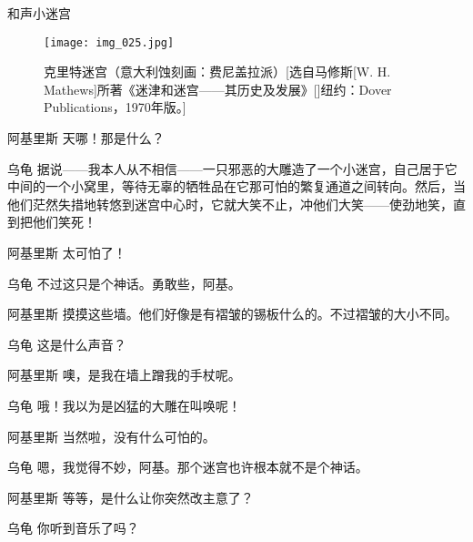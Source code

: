 \begin{dialog}{和声小迷宫}
\begin{dialogue}
\begin{dialogue}
\begin{dialogue}
\begin{dialogue}
\begin{figure}
\texttt{[image: img\_025.jpg]}
\caption[克里特迷宫。]
  {克里特迷宫（意大利蚀刻画：费尼盖拉派）[选自马修斯[W. H. Mathews]所著《迷津和迷宫——其历史及发展》[]纽约：Dover Publications，1970年版。]}
\end{figure}

      \item[阿基里斯]天哪！那是什么？

      \item[乌龟]据说——我本人从不相信——一只邪恶的大雕造了一个小迷宫，自己居于它中间的一个小窝里，等待无辜的牺牲品在它那可怕的繁复通道之间转向。然后，当他们茫然失措地转悠到迷宫中心时，它就大笑不止，冲他们大笑——使劲地笑，直到把他们笑死！

      \item[阿基里斯]太可怕了！

      \item[乌龟]不过这只是个神话。勇敢些，阿基。


      \item[阿基里斯]摸摸这些墙。他们好像是有褶皱的锡板什么的。不过褶皱的大小不同。


      \item[乌龟\dlnote{（吃惊地）}]这是什么声音？

      \item[阿基里斯]噢，是我在墙上蹭我的手杖呢。

      \item[乌龟]哦！我以为是凶猛的大雕在叫唤呢！

      \item[阿基里斯]当然啦，没有什么可怕的。


      \item[乌龟]嗯，我觉得不妙，阿基。那个迷宫也许根本就不是个神话。

      \item[阿基里斯]等等，是什么让你突然改主意了？

      \item[乌龟]你听到音乐了吗？



\end{dialogue}
\end{dialogue}
\end{dialogue}
\end{dialogue}
\end{dialog}
